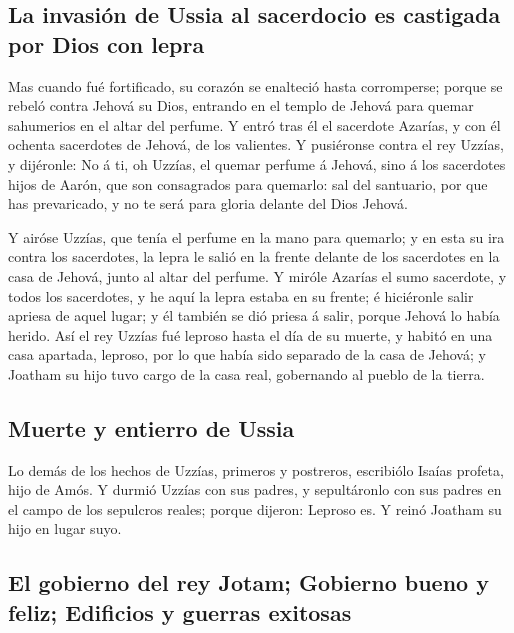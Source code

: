 \hypertarget{la-invasiuxf3n-de-ussia-al-sacerdocio-es-castigada-por-dios-con-lepra}{%
\subsection{La invasión de Ussia al sacerdocio es castigada por Dios con
lepra}\label{la-invasiuxf3n-de-ussia-al-sacerdocio-es-castigada-por-dios-con-lepra}}

 Mas cuando fué fortificado, su corazón se enalteció
hasta corromperse; porque se rebeló contra Jehová su Dios, entrando en
el templo de Jehová para quemar sahumerios en el altar del perfume.
 Y entró tras él el sacerdote Azarías, y con él ochenta
sacerdotes de Jehová, de los valientes.  Y pusiéronse
contra el rey Uzzías, y dijéronle: No á ti, oh Uzzías, el quemar perfume
á Jehová, sino á los sacerdotes hijos de Aarón, que son consagrados para
quemarlo: sal del santuario, por que has prevaricado, y no te será para
gloria delante del Dios Jehová.

 Y airóse Uzzías, que tenía el perfume en la mano para
quemarlo; y en esta su ira contra los sacerdotes, la lepra le salió en
la frente delante de los sacerdotes en la casa de Jehová, junto al altar
del perfume.  Y miróle Azarías el sumo sacerdote, y todos
los sacerdotes, y he aquí la lepra estaba en su frente; é hiciéronle
salir apriesa de aquel lugar; y él también se dió priesa á salir, porque
Jehová lo había herido.  Así el rey Uzzías fué leproso
hasta el día de su muerte, y habitó en una casa apartada, leproso, por
lo que había sido separado de la casa de Jehová; y Joatham su hijo tuvo
cargo de la casa real, gobernando al pueblo de la tierra.

\hypertarget{muerte-y-entierro-de-ussia}{%
\subsection{Muerte y entierro de
Ussia}\label{muerte-y-entierro-de-ussia}}

 Lo demás de los hechos de Uzzías, primeros y postreros,
escribiólo Isaías profeta, hijo de Amós.  Y durmió Uzzías
con sus padres, y sepultáronlo con sus padres en el campo de los
sepulcros reales; porque dijeron: Leproso es. Y reinó Joatham su hijo en
lugar suyo.

\hypertarget{el-gobierno-del-rey-jotam-gobierno-bueno-y-feliz-edificios-y-guerras-exitosas}{%
\subsection{El gobierno del rey Jotam; Gobierno bueno y feliz; Edificios
y guerras
exitosas}\label{el-gobierno-del-rey-jotam-gobierno-bueno-y-feliz-edificios-y-guerras-exitosas}}

